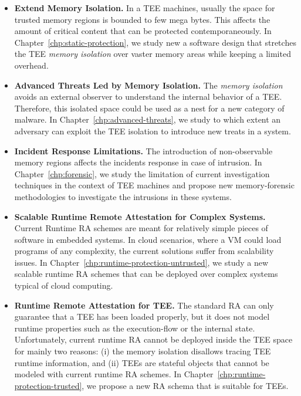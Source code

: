 \begin{itemize}
	\item[\circledrA{1}] \textbf{Extend Memory Isolation.}
	In a TEE machines, usually the space for trusted memory regions is bounded 
	to few mega bytes. 
	This affects the amount of critical content that can be protected 	
	contemporaneously.
	In Chapter~\ref{chp:static-protection}, we study new a software design that 
	stretches the TEE \emph{memory isolation} over vaster memory areas while 
	keeping a limited overhead.
	
	\item[\circledrA{2}] \textbf{Advanced Threats Led by Memory Isolation.} The 
	\emph{memory isolation} avoids an external observer to understand the 
	internal behavior of a TEE. Therefore, this isolated space could 
	be used as a nest for a new category of malware.
	In Chapter~\ref{chp:advanced-threats}, we study to which extent an 
	adversary can exploit the TEE isolation to introduce new treats in a system.

	\item[\circledrA{3}]
	\textbf{Incident Response Limitations.} The introduction of 
	non-observable memory regions affects the incidents response in 
	case of intrusion.
	In Chapter~\ref{chp:forensic}, we study the limitation of current 
	investigation techniques in the context of TEE machines and propose new 
	memory-forensic methodologies to investigate the intrusions in these 
	systems.
	
	\item[\circledrA{4}]
	\textbf{Scalable Runtime Remote Attestation for Complex Systems.}
	Current Runtime RA schemes are meant for relatively simple pieces of 
	software in embedded systems.
	In cloud scenarios, where a VM could load programs of any complexity, the 
	current solutions suffer from scalability issues.
	In Chapter~\ref{chp:runtime-protection-untrusted}, we study a new scalable 
	runtime RA schemes that can be deployed over 
	complex systems typical of cloud computing.
	
	\item[\circledrA{5}]
	\textbf{Runtime Remote Attestation for TEE.} 
	The standard RA can only guarantee that a TEE has been 
	loaded properly, but it does not model runtime properties such as the 
	execution-flow or the internal state.
	Unfortunately, current runtime RA cannot be deployed inside the TEE space
	for mainly two reasons: (i) the memory isolation disallows tracing TEE
	runtime information, and (ii) TEEs are stateful objects that cannot be 
	modeled with current runtime RA schemes.
	In Chapter~\ref{chp:runtime-protection-trusted}, we propose a new RA schema 
	that is suitable for TEEs.
	
\end{itemize}

